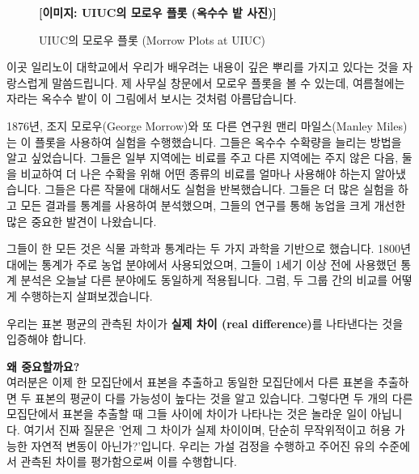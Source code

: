 \documentclass[11pt,a4paper]{book}
\theoremstyle{definition}
\begin{document}
\begin{figure}[h!]
    \centering
    \textbf{[이미지: UIUC의 모로우 플롯 (옥수수 밭 사진)]}
    \caption{UIUC의 모로우 플롯 (Morrow Plots at UIUC)}
    \label{fig:morrow_plots}
\end{figure}
\begin{infobox}[title=모로우 플롯: 1세기의 학습과 통계의 뿌리]
이곳 일리노이 대학교에서 우리가 배우려는 내용이 깊은 뿌리를 가지고 있다는 것을 자랑스럽게 말씀드립니다. 제 사무실 창문에서 모로우 플롯을 볼 수 있는데, 여름철에는 자라는 옥수수 밭이 이 그림에서 보시는 것처럼 아름답습니다.

1876년, 조지 모로우(George Morrow)와 또 다른 연구원 맨리 마일스(Manley Miles)는 이 플롯을 사용하여 실험을 수행했습니다. 그들은 옥수수 수확량을 늘리는 방법을 알고 싶었습니다. 그들은 일부 지역에는 비료를 주고 다른 지역에는 주지 않은 다음, 둘을 비교하여 더 나은 수확을 위해 어떤 종류의 비료를 얼마나 사용해야 하는지 알아냈습니다. 그들은 다른 작물에 대해서도 실험을 반복했습니다. 그들은 더 많은 실험을 하고 모든 결과를 통계를 사용하여 분석했으며, 그들의 연구를 통해 농업을 크게 개선한 많은 중요한 발견이 나왔습니다.

그들이 한 모든 것은 식물 과학과 통계라는 두 가지 과학을 기반으로 했습니다. 1800년대에는 통계가 주로 농업 분야에서 사용되었으며, 그들이 1세기 이상 전에 사용했던 통계 분석은 오늘날 다른 분야에도 동일하게 적용됩니다. 그럼, 두 그룹 간의 비교를 어떻게 수행하는지 살펴보겠습니다.
\end{infobox}

\begin{infobox}[title=평가 방법: '실제 차이'의 중요성]
우리는 표본 평균의 관측된 차이가 \textbf{실제 차이 (real difference)}를 나타낸다는 것을 입증해야 합니다.

\textbf{왜 중요할까요?} \\
여러분은 이제 한 모집단에서 표본을 추출하고 동일한 모집단에서 다른 표본을 추출하면 두 표본의 평균이 다를 가능성이 높다는 것을 알고 있습니다. 그렇다면 두 개의 다른 모집단에서 표본을 추출할 때 그들 사이에 차이가 나타나는 것은 놀라운 일이 아닙니다. 여기서 진짜 질문은 '언제 그 차이가 실제 차이이며, 단순히 무작위적이고 허용 가능한 자연적 변동이 아닌가?'입니다. 우리는 가설 검정을 수행하고 주어진 유의 수준에서 관측된 차이를 평가함으로써 이를 수행합니다.
\end{infobox}
\end{document}
